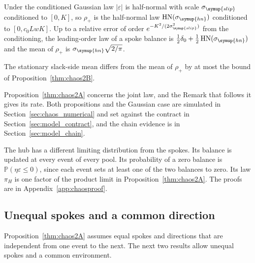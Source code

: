 \documentclass[11pt,a4paper]{article}
\theoremstyle{siphon}
\begin{document}
Under the conditioned Gaussian law $|\varepsilon|$ is half-normal with scale $\sigma_{\symup{slip}}$ conditioned to $[0, K]$, so $\rho_+$ is the half-normal law $\mathrm{HN}(\sigma_{\symup{hn}})$ conditioned to $[0, c_0 LwK]$. Up to a relative error of order $e^{-K^2/(2\sigma_{\symup{slip}}^2)}$ from the conditioning, the leading-order law of a spoke balance is $\tfrac{1}{2}\delta_0 + \tfrac{1}{2}\,\mathrm{HN}(\sigma_{\symup{hn}})$ and the mean of $\rho_+$ is $\sigma_{\symup{hn}}\sqrt{2/\pi}$. 

The stationary slack-side mean differs from the mean of $\rho_+$ by at most the bound of Proposition~\ref{thm:chaos2B}.

Proposition~\ref{thm:chaos2A} concerns the joint law, and the Remark that follows it gives its rate. Both propositions and the Gaussian case are simulated in Section~\ref{sec:chaos_numerical} and set against the contract in Section~\ref{sec:model_contract}, and the chain evidence is in Section~\ref{sec:model_chain}.

The hub has a different limiting distribution from the spokes. Its balance is updated at every event of every pool. Its probability of a zero balance is $\mathbb{P}(\eta \varepsilon \leq 0)$, since each event sets at least one of the two balances to zero. Its law $\pi_H$ is one factor of the product limit in Proposition~\ref{thm:chaos2A}. The proofs are in Appendix~\ref{app:chaosproof}.
\subsection{Unequal spokes and a common direction}\label{sec:chaos_hetero}

Proposition~\ref{thm:chaos2A} assumes equal spokes and directions that are independent from one event to the next. The next two results allow unequal spokes and a common environment.
\end{document}

